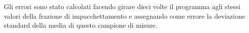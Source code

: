 Gli errori sono stato calcolati facendo girare dieci volte il programma agli stessi valori della frazione di impacchettamento e assegnando come errore la deviazione standard della media di questo campione di misure.

\begin{figure}[ht]
	\centering
\end{figure}

